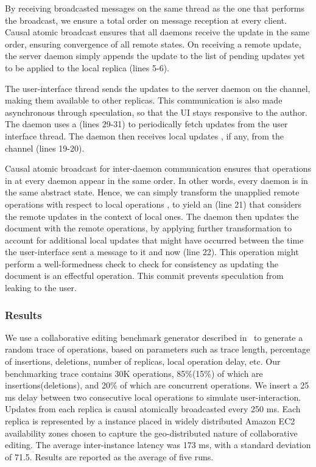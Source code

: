 By receiving broadcasted messages on the same thread as the one that performs
the broadcast, we ensure a total order on message reception at every client.
Causal atomic broadcast ensures that all daemons receive the update in the same
order, ensuring convergence of all remote states. On receiving a remote update,
the server daemon simply appends the update to the list of pending updates yet
to be applied to the local replica (lines 5-6).

The user-interface thread sends the updates to the server daemon on the 
channel, making them available to other replicas. This communication is also
made asynchronous through speculation, so that the UI stays responsive to the
author. The daemon uses a  (lines 29-31) to periodically
fetch updates from the user interface thread. The daemon then receives local
updates , if any, from the channel  (lines 19-20).

Causal atomic broadcast for inter-daemon communication ensures that operations
in  at every daemon appear in the same order. In other words, every
daemon is in the same abstract state. Hence, we can simply transform the
unapplied remote operations  with respect to local operations
, to yield an  (line 21) that considers the remote updates in
the context of local ones.  The daemon then updates the document with the
remote operations, by applying further transformation to account for additional
local updates that might have occurred between the time the user-interface sent
a message to it and now (line 22). This operation might perform a
well-formedness check to check for consistency as updating the document is an
effectful operation. This commit prevents speculation from leaking to the user.

\subsubsection{Results}

We use a collaborative editing benchmark generator described
in~\cite{MartinAU12} to generate a random trace of operations, based on
parameters such as trace length, percentage of insertions, deletions, number of
replicas, local operation delay, etc. Our benchmarking trace contains 30K
operations, 85\%(15\%) of which are insertions(deletions), and 20\% of which
are concurrent operations. We insert a 25 ms delay between two consecutive
local operations to simulate user-interaction. Updates from each replica is
causal atomically broadcasted every 250 ms. Each replica is represented by a
\rxcml instance placed in widely distributed Amazon EC2 availability zones
chosen to capture the geo-distributed nature of collaborative editing. The
average inter-instance latency was 173 ms, with a standard deviation of 71.5.
Results are reported as the average of five runs.

